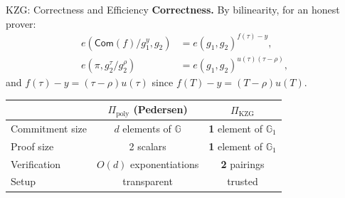 \documentclass{zkdl-presentation-template}
\begin{document}
    \begin{frame}{KZG: Correctness and Efficiency}
        \textbf{Correctness.} By bilinearity, for an honest prover:
        \begin{align*}
            e(\mathsf{Com}(f)/g_1^{y}, g_2) &= e(g_1, g_2)^{f(\tau) - y}, \\
            e(\pi, g_2^{\tau}/g_2^{\rho}) &= e(g_1, g_2)^{u(\tau)(\tau - \rho)},
        \end{align*}
        and $f(\tau) - y = (\tau - \rho)u(\tau)$ since $f(T) - y = (T - \rho)u(T)$.
        \pause

        \vspace{0.2cm}
        \begin{center}
            \renewcommand{\arraystretch}{1.3}
            \begin{tabular}{lcc}
                & $\Pi_{\text{poly}}$ (Pedersen) & $\Pi_{\text{KZG}}$ \\
                \hline
                Commitment size & $d$ elements of $\mathbb{G}$ & \textbf{1} element of $\mathbb{G}_1$ \\
                Proof size & 2 scalars & \textbf{1} element of $\mathbb{G}_1$ \\
                Verification & $O(d)$ exponentiations & \textbf{2} pairings \\
                Setup & transparent & \textcolor{oc-red-8}{trusted} \\
            \end{tabular}
        \end{center}
    \end{frame}
\end{document}
